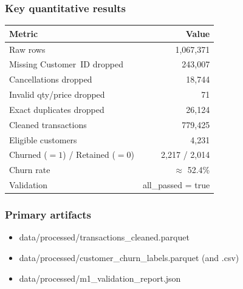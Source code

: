 \documentclass[11pt,a4paper]{article}
\renewcommand{\texttt}[1]{#1}
\begin{document}
\subsubsection*{Key quantitative results}
\begin{tabular}{|l|r|}
\hline
\textbf{Metric} & \textbf{Value} \\
\hline
Raw rows & 1{,}067{,}371 \\
\hline
Missing Customer~ID dropped & 243{,}007 \\
\hline
Cancellations dropped & 18{,}744 \\
\hline
Invalid qty/price dropped & 71 \\
\hline
Exact duplicates dropped & 26{,}124 \\
\hline
Cleaned transactions & 779{,}425 \\
\hline
Eligible customers & 4{,}231 \\
\hline
Churned ($=1$) / Retained ($=0$) & 2{,}217 / 2{,}014 \\
\hline
Churn rate & $\approx$ 52.4\% \\
\hline
Validation & \texttt{all\_passed = true} \\
\hline
\end{tabular}

\subsubsection*{Primary artifacts}
\begin{itemize}
  \item \texttt{data/processed/transactions\_cleaned.parquet}
  \item \texttt{data/processed/customer\_churn\_labels.parquet} (and \texttt{.csv})
  \item \texttt{data/processed/m1\_validation\_report.json}
\end{itemize}
\end{document}
